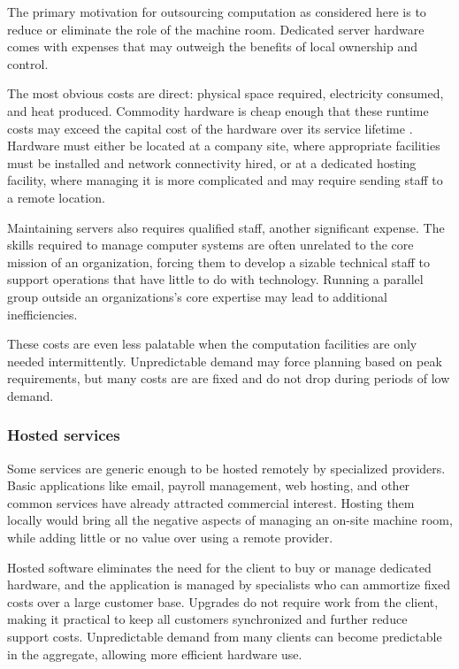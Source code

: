 The primary motivation for outsourcing computation as considered here is to reduce or eliminate the role of the machine room. Dedicated server hardware comes with expenses that may outweigh the benefits of local ownership and control.

The most obvious costs are direct: physical space required, electricity consumed, and heat produced. Commodity hardware is cheap enough that these runtime costs may exceed the capital cost of the hardware over its service lifetime \cite{barroso05}. Hardware must either be located at a company site, where appropriate facilities must be installed and network connectivity hired, or at a dedicated hosting facility, where managing it is more complicated and may require sending staff to a remote location.

Maintaining servers also requires qualified staff, another significant expense. The skills required to manage computer systems are often unrelated to the core mission of an organization, forcing them to develop a sizable technical staff to support operations that have little to do with technology. Running a parallel group outside an organizations's core expertise may lead to additional inefficiencies.

These costs are even less palatable when the computation facilities are only needed intermittently. Unpredictable demand may force planning based on peak requirements, but many costs are are fixed and do not drop during periods of low demand.

\subsubsection{Hosted services}

Some services are generic enough to be hosted remotely by specialized providers. Basic applications like email, payroll management, web hosting, and other common services have already attracted commercial interest. Hosting them locally would bring all the negative aspects of managing an on-site machine room, while adding little or no value over using a remote provider.

Hosted software eliminates the need for the client to buy or manage dedicated hardware, and the application is managed by specialists who can ammortize fixed costs over a large customer base. Upgrades do not require work from the client, making it practical to keep all customers synchronized and further reduce support costs. Unpredictable demand from many clients can become predictable in the aggregate, allowing more efficient hardware use.

